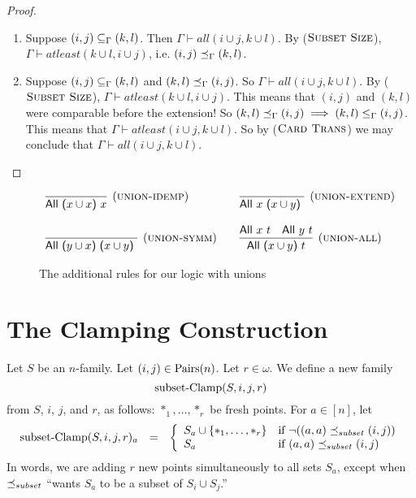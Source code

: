 \documentclass[12pt]{article}
\theoremstyle{definition}
\newcommand{\set}[1]{\{ #1 \}}
\newlength{\mathfrwidth}
\newenvironment{mathframe}
    {\begin{lrbox}{\mathfrbox}\begin{minipage}{\mathfrwidth}\begin{center}}
    {\end{center}\end{minipage}\end{lrbox}\noindent\fbox{\usebox{\mathfrbox}}}
\newcommand{\nott}{\neg}
\begin{document}
\begin{proof}
\begin{enumerate}
    \item Suppose $(i, j) \subseteq_{\Gamma} (k, l)$.  Then $\Gamma \vdash all(i \cup j, k \cup l)$.  By ($\textsc{Subset Size}$), $\Gamma \vdash atleast(k \cup l, i \cup j)$, i.e. $(i, j) \preceq_{\Gamma} (k, l)$.
    
    \item Suppose $(i, j) \subseteq_{\Gamma} (k, l)$ and $(k, l) \preceq_{\Gamma} (i, j)$.  So $\Gamma \vdash all(i \cup j, k \cup l)$.  By ($\textsc{Subset Size}$), $\Gamma \vdash atleast(k \cup l, i \cup j)$.  This means that $(i,j)$ and $(k,l)$ were comparable before the extension!  So $(k,l) \preceq_{\Gamma} (i,j) \implies (k,l) \le_{\Gamma} (i,j)$.  This means that $\Gamma \vdash atleast(i \cup j, k \cup l)$.  So by ($\textsc{Card Trans}$) we may conclude that $\Gamma \vdash all(i \cup j, k \cup l)$.
    
\end{enumerate}
\end{proof}

\begin{figure}[t]
\begin{mathframe}
\[
\begin{array}{l@{\qquad}l@{\qquad}l}
\infer[(\proverule{union-idemp})]{\mbox{\sf All ($x\cup x$) $x$}}{} &
\infer[(\proverule{union-extend})]{\mbox{\sf All $x$ ($x\cup y$) }}{}   \\  \\
\infer[(\proverule{union-symm})]{\mbox{\sf All ($y \cup x$) ($x\cup y$) }}{} &
\infer[(\proverule{union-all})]{\mbox{\sf All ($x\cup y$) $t$}}{\mbox{\sf All $x$ $t$} & \mbox{\sf All $y$ $t$}}
\end{array}
\]
\caption{The additional rules for our logic with unions
\label{fig-all-unions-2}}
\end{mathframe}
\end{figure}


\section{The Clamping Construction}

 Let $S$ be an $n$-family.
 Let $(i,j)\in\mbox{Pairs}(n)$.
 Let $r\in \omega$.
 We define a new family 
 \[ \mbox{subset-Clamp}(S,i,j,r)\]
 from $S$, $i$, $j$, and $r$, as follows:
$*_1,\ldots, *_r$ be   fresh points.
For $a\in[n]$, let 
\[ \begin{array}{lcl}
\sClamp(S,i,j,r)_a & = & \left\{
\begin{array}{ll}
S_a \cup \set{*_1,\ldots, *_r} & \mbox{if $\nott ((a,a)\precsubseteq (i,j))$}\\
 S_a & \mbox{if $(a,a)\precsubseteq (i,j)$}\\ 
 \end{array}
 \right.
\end{array}
\]
In words, we are adding $r$ new points
simultaneously to all sets $S_a$, except when 
$\preceq_{\scriptsize subset}$ ``wants 
$S_a$ to be a subset of  $S_i\cup S_j$.''
\end{document}
